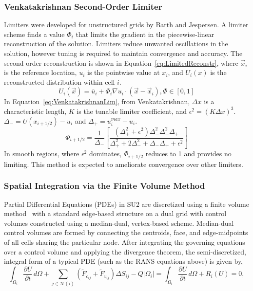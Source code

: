 \subsubsection*{Venkatakrishnan Second-Order Limiter}
Limiters were developed for unstructured grids by Barth and Jespersen\cite{barth1989}. A limiter scheme finds a value $\Phi_i$ that limits the gradient in the piecewise-linear reconstruction of the solution. Limiters reduce unwanted oscillations in the solution, however tuning is required to maintain convergence and accuracy. The second-order reconstruction is shown in Equation~\ref{eq:LimitedReconstr}, where $\vec{x}_i$ is the reference location, $u_i$ is the pointwise value at $x_i$, and $U_i(x)$ is the reconstructed distribution within cell $i$.
\begin{equation}\label{eq:LimitedReconstr}
U_i(\vec{x}) = \bar{u}_i + \Phi_i \nabla u_i \cdot (\vec{x}-\vec{x}_i ), \Phi\in [0,1]
\end{equation}
In Equation~\ref{eq:VenkatakrishnanLim}, from Venkatakrishnan\cite{Venkatakrishnan:1993}, $\Delta x$ is a characteristic length, $K$ is the tunable limiter coefficient, and $\epsilon^2 = (K\Delta x)^3$. $\Delta_-=U(x_{i+1/2})-u_i$ and $\Delta_+ = u_i^{max}-u_i$. 
\begin{equation}\label{eq:VenkatakrishnanLim}
\Phi_{i+1/2} = \frac{1}{\Delta_-}\left[ \frac{(\Delta_+^2+\epsilon^2)\Delta_-^2\Delta_-^2\Delta_+}{\Delta_+^2+2\Delta_-^2+\Delta_-\Delta_++\epsilon^2}\right]
\end{equation}
In smooth regions, where $\epsilon^2$ dominates,  $\Phi_{i+1/2}$ reduces to 1 and provides no limiting. This method is expected to ameliorate convergence over other limiters. 
\subsubsection*{Spatial Integration via the Finite Volume Method}

Partial Differential Equations (PDEs) in SU2 are discretized using a finite volume method~\cite{barth95, hirsch1984,quarteroni97, jameson01, leveque02, wesseling00, jameson:1995a, jameson:1995b, toro1999} with a standard edge-based structure on a dual grid with control volumes constructed using a median-dual, vertex-based scheme. Median-dual control volumes are formed by connecting the centroids, face, and edge-midpoints of all cells sharing the particular node. After integrating the governing equations over a control volume and applying the divergence theorem, the semi-discretized, integral form of a typical PDE (such as the RANS equations above) is given by,
\begin{equation} \label{eq:DiscretizedEq}
\int_{\Omega_i}{\frac{\partial{U}}{\partial{t}}}\,d\Omega + \sum_{j \in \mathcal{N}(i)}(\tilde{F}_{c_{ij}}+\tilde{F}_{v_{ij}})\Delta{S}_{ij} -Q|\Omega_i| = \int_{\Omega_i}{\frac{\partial{U}}{\partial{t}}}\,d\Omega + R_i(U) = 0,
\end{equation}
 
